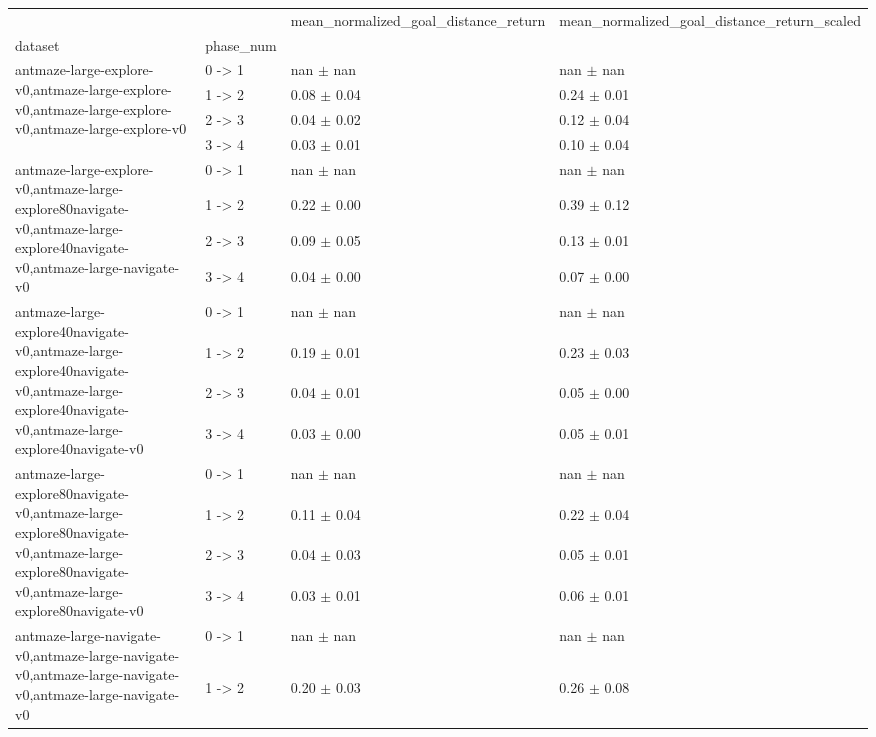 \begin{tabular}{llll}
\toprule
 &  & mean_normalized_goal_distance_return & mean_normalized_goal_distance_return_scaled \\
dataset & phase_num &  &  \\
\midrule
\multirow[t]{4}{*}{antmaze-large-explore-v0,antmaze-large-explore-v0,antmaze-large-explore-v0,antmaze-large-explore-v0} & 0 -> 1 & nan $\pm$ nan & nan $\pm$ nan \\
 & 1 -> 2 & 0.08 $\pm$ 0.04 & 0.24 $\pm$ 0.01 \\
 & 2 -> 3 & 0.04 $\pm$ 0.02 & 0.12 $\pm$ 0.04 \\
 & 3 -> 4 & 0.03 $\pm$ 0.01 & 0.10 $\pm$ 0.04 \\
\cline{1-4}
\multirow[t]{4}{*}{antmaze-large-explore-v0,antmaze-large-explore80navigate-v0,antmaze-large-explore40navigate-v0,antmaze-large-navigate-v0} & 0 -> 1 & nan $\pm$ nan & nan $\pm$ nan \\
 & 1 -> 2 & 0.22 $\pm$ 0.00 & 0.39 $\pm$ 0.12 \\
 & 2 -> 3 & 0.09 $\pm$ 0.05 & 0.13 $\pm$ 0.01 \\
 & 3 -> 4 & 0.04 $\pm$ 0.00 & 0.07 $\pm$ 0.00 \\
\cline{1-4}
\multirow[t]{4}{*}{antmaze-large-explore40navigate-v0,antmaze-large-explore40navigate-v0,antmaze-large-explore40navigate-v0,antmaze-large-explore40navigate-v0} & 0 -> 1 & nan $\pm$ nan & nan $\pm$ nan \\
 & 1 -> 2 & 0.19 $\pm$ 0.01 & 0.23 $\pm$ 0.03 \\
 & 2 -> 3 & 0.04 $\pm$ 0.01 & 0.05 $\pm$ 0.00 \\
 & 3 -> 4 & 0.03 $\pm$ 0.00 & 0.05 $\pm$ 0.01 \\
\cline{1-4}
\multirow[t]{4}{*}{antmaze-large-explore80navigate-v0,antmaze-large-explore80navigate-v0,antmaze-large-explore80navigate-v0,antmaze-large-explore80navigate-v0} & 0 -> 1 & nan $\pm$ nan & nan $\pm$ nan \\
 & 1 -> 2 & 0.11 $\pm$ 0.04 & 0.22 $\pm$ 0.04 \\
 & 2 -> 3 & 0.04 $\pm$ 0.03 & 0.05 $\pm$ 0.01 \\
 & 3 -> 4 & 0.03 $\pm$ 0.01 & 0.06 $\pm$ 0.01 \\
\cline{1-4}
\multirow[t]{4}{*}{antmaze-large-navigate-v0,antmaze-large-navigate-v0,antmaze-large-navigate-v0,antmaze-large-navigate-v0} & 0 -> 1 & nan $\pm$ nan & nan $\pm$ nan \\
 & 1 -> 2 & 0.20 $\pm$ 0.03 & 0.26 $\pm$ 0.08 \\

\end{tabular}
